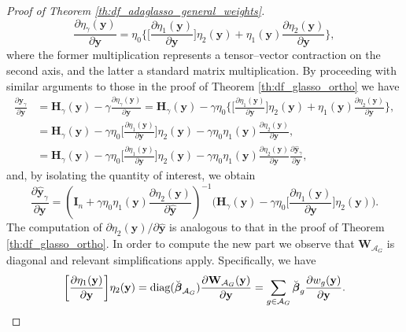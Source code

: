 \documentclass[a4paper, 12pt]{article}
\newcommand{\Aset}{\mathcal{A}}
\def\bbeta{\boldsymbol{\beta}}
\def\by{\boldsymbol{y}}
\def\bH{\mathbf{H}}
\def\bI{\mathbf{I}}
\def\bW{\mathbf{W}}
\def\by{\mathbf{y}}
\begin{document}
\begin{appendix}
\begin{proof}[Proof of Theorem \ref{th:df_adaglasso_general_weights}]
\begin{equation*}
\frac{\partial \eta_\gamma(\by)}{\partial \by} = \eta_0 \bigg \{ \bigg[ \frac{\partial \eta_1(\by)}{\partial \by} \bigg] \eta_2(\by) + \eta_1(\by) \frac{\partial \eta_2(\by)}{\partial \by} \bigg\},
\end{equation*}
where the former multiplication represents a tensor–vector contraction on the second axis, and the latter a standard matrix multiplication. By proceeding with similar arguments to those in the proof of Theorem \ref{th:df_glasso_ortho} we have
\begin{equation*}
\begin{aligned}
\frac{\partial \widehat{\by}_\gamma}{\partial \by}&=\bH_\gamma(\by)-\gamma \frac{\partial\eta_\gamma(\by)}{\partial\by}= \bH_\gamma(\by)-\gamma \eta_0 \bigg \{ \bigg[ \frac{\partial \eta_1(\by)}{\partial \by} \bigg] \eta_2(\by) + \eta_1(\by) \frac{\partial \eta_2(\by)}{\partial \by} \bigg\},\\
&= \bH_\gamma(\by)-\gamma \eta_0  \bigg[ \frac{\partial \eta_1(\by)}{\partial \by} \bigg] \eta_2(\by) -\gamma \eta_0 \eta_1(\by) \frac{\partial \eta_2(\by)}{\partial \by},\\
&= \bH_\gamma(\by)-\gamma \eta_0  \bigg[ \frac{\partial \eta_1(\by)}{\partial \by} \bigg] \eta_2(\by) -\gamma \eta_0 \eta_1(\by) \frac{\partial \eta_2(\by)}{\partial \widehat{\by}}\frac{\partial \widehat{\by}_\gamma}{\partial\by},
\end{aligned}
\end{equation*}
and, by isolating the quantity of interest, we obtain
\begin{equation}
\label{eq:I_plus_eta2_inverse_H_minus_eta1}
\frac{\partial \widehat{\by}_\gamma}{\partial\by}=\left(\bI_n+\gamma \eta_0 \eta_1(\by) \frac{\partial\eta_2(\by)}{\partial \widehat{\by}}\right)^{-1} \bigg(\bH_\gamma(\by) - \gamma \eta_0 \bigg[ \frac{\partial \eta_1(\by)}{\partial \by} \bigg] \eta_2(\by) \bigg). 
\end{equation}
The computation of $\partial \eta_2(\by)/\partial \widehat{\by}$ is analogous to that in the proof of Theorem \ref{th:df_glasso_ortho}. In order to compute the new part we observe that $\bW_{\Aset_G}$ is diagonal and relevant simplifications apply. Specifically, we have
\begin{equation*}
\bigg[ \frac{\partial \eta_1(\by)}{\partial \by} \bigg] \eta_2(\by) = \textrm{diag}(\Breve{\bbeta}_{\Aset_G})\frac{\partial \bW_{\Aset_G}(\by)}{\partial \by} = \sum_{g \in \Aset_G} \breve{\bbeta}_g \frac{\partial w_g(\by)}{\partial \by}.

\end{equation*}
\end{proof}
\end{appendix}
\end{document}

